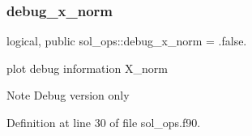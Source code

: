 \subsubsection{\texorpdfstring{debug\+\_\+x\+\_\+norm}{debug\_x\_norm}}
{\footnotesize\ttfamily logical, public sol\+\_\+ops\+::debug\+\_\+x\+\_\+norm = .false.}



plot debug information {\ttfamily X\+\_\+norm} 

\begin{DoxyNote}{Note}
Debug version only 
\end{DoxyNote}


Definition at line 30 of file sol\+\_\+ops.\+f90.

